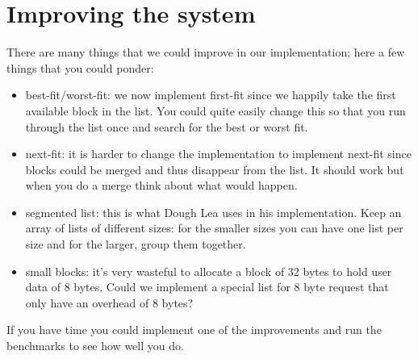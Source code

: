 \documentclass[a4paper,11pt]{article}
\begin{document}
 
\section{Improving the system}

There are many things that we could improve in our implementation;
here a few things that you could ponder:

\begin{itemize}
\item best-fit/worst-fit: we now implement first-fit since we happily
  take the first available block in the list. You could quite easily
  change this so that you run through the list once and search for the
  best or worst fit.

\item next-fit: it is harder to change the implementation to implement
  next-fit since blocks could be merged and thus disappear from the
  list. It should work but when you do a merge think about what would
  happen.

\item segmented list: this is what Dough Lea uses in his
  implementation. Keep an array of lists of different sizes: for the
  smaller sizes you can have one list per size and for the larger,
  group them together.

\item small blocks: it's very wasteful to allocate a block of 32
  bytes to hold user data of 8 bytes. Could we implement a special
  list for 8 byte request that only have an overhead of 8 bytes?
  
\end{itemize}

If you have time you could implement one of the improvements and run
the benchmarks to see how well you do.
\end{document}
